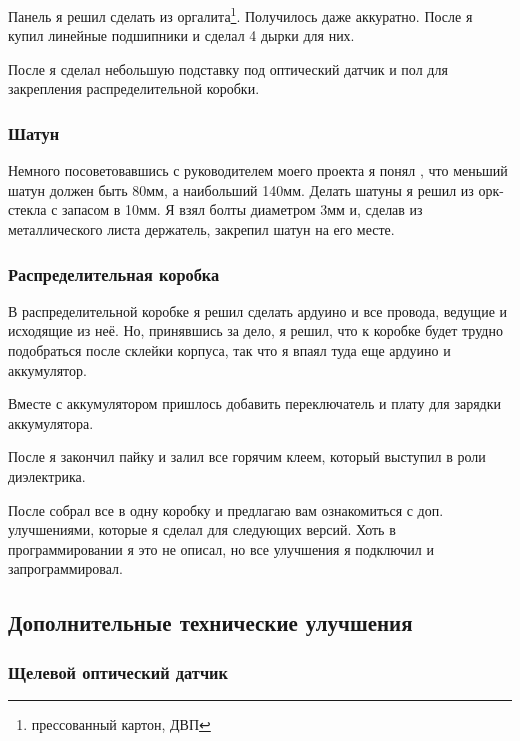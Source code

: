 \documentclass[a4paper, 12pt]{article}
\begin{document}
Панель я решил сделать из оргалита\footnote{прессованный картон, ДВП}.
Получилось даже аккуратно. После я купил линейные подшипники и сделал 4 дырки
для них.

После я сделал небольшую подставку под оптический датчик и пол для закрепления
распределительной коробки.
\subsubsection{Шатун}

Немного посоветовавшись с руководителем моего проекта я понял , что меньший
шатун должен быть 80мм, а наибольший 140мм. Делать шатуны я решил из орк-стекла
с запасом в 10мм. Я взял болты диаметром 3мм и, сделав из металлического листа
держатель, закрепил шатун на его месте.

\subsubsection{Распределительная коробка}

В распределительной коробке я решил сделать ардуино и все провода, ведущие и
исходящие из неё. Но, принявшись за дело, я решил, что к коробке будет трудно
подобраться после склейки корпуса, так что я впаял туда еще ардуино и
аккумулятор.

Вместе с аккумулятором пришлось добавить переключатель и плату для зарядки
аккумулятора.

После я закончил пайку и залил все горячим клеем, который выступил в роли
диэлектрика.

После собрал все в одну коробку и предлагаю вам ознакомиться с доп.
улучшениями, которые я сделал для следующих версий. Хоть в программировании я
это не описал, но все улучшения я подключил и запрограммировал.

\subsection{Дополнительные технические улучшения}

\subsubsection{Щелевой оптический датчик}
\end{document}
